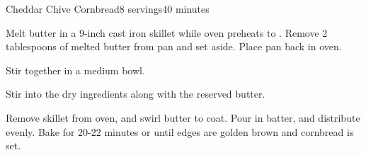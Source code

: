 \documentclass[../Cookbook.tex]{subfiles}
\begin{document}
\begin{recipe}{Cheddar Chive Cornbread}{8 servings}{40 minutes}

Melt butter in a 9-inch cast iron skillet while oven preheats to . Remove 2 tablespoons of melted butter from pan and set aside. Place pan back in oven.

Stir together in a medium bowl.

Stir into the dry ingredients along with the reserved butter.

Remove skillet from oven, and swirl butter to coat. Pour in batter, and distribute evenly. Bake for 20-22 minutes or until edges are golden brown and cornbread is set.

\end{recipe}
\end{document}

